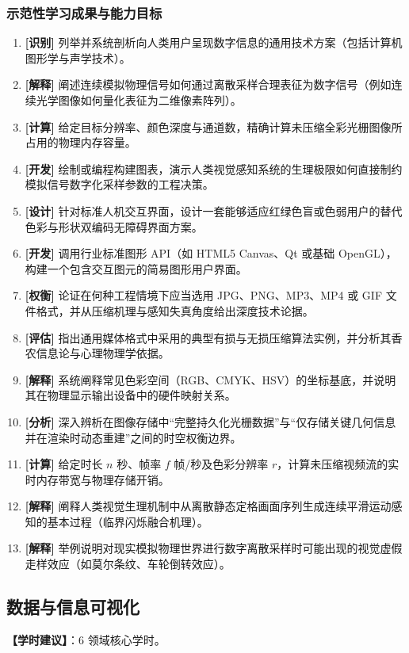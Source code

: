 \subsubsection{示范性学习成果与能力目标}
\begin{enumerate}
    \item \textbf{[识别]} 列举并系统剖析向人类用户呈现数字信息的通用技术方案（包括计算机图形学与声学技术）。
    \item \textbf{[解释]} 阐述连续模拟物理信号如何通过离散采样合理表征为数字信号（例如连续光学图像如何量化表征为二维像素阵列）。
    \item \textbf{[计算]} 给定目标分辨率、颜色深度与通道数，精确计算未压缩全彩光栅图像所占用的物理内存容量。
    \item \textbf{[开发]} 绘制或编程构建图表，演示人类视觉感知系统的生理极限如何直接制约模拟信号数字化采样参数的工程决策。
    \item \textbf{[设计]} 针对标准人机交互界面，设计一套能够适应红绿色盲或色弱用户的替代色彩与形状双编码无障碍界面方案。
    \item \textbf{[开发]} 调用行业标准图形 API（如 HTML5 Canvas、Qt 或基础 OpenGL），构建一个包含交互图元的简易图形用户界面。
    \item \textbf{[权衡]} 论证在何种工程情境下应当选用 JPG、PNG、MP3、MP4 或 GIF 文件格式，并从压缩机理与感知失真角度给出深度技术论据。
    \item \textbf{[评估]} 指出通用媒体格式中采用的典型有损与无损压缩算法实例，并分析其香农信息论与心理物理学依据。
    \item \textbf{[解释]} 系统阐释常见色彩空间（RGB、CMYK、HSV）的坐标基底，并说明其在物理显示输出设备中的硬件映射关系。
    \item \textbf{[分析]} 深入辨析在图像存储中“完整持久化光栅数据”与“仅存储关键几何信息并在渲染时动态重建”之间的时空权衡边界。
    \item \textbf{[计算]} 给定时长 $n$ 秒、帧率 $f$ 帧/秒及色彩分辨率 $r$，计算未压缩视频流的实时内存带宽与物理存储开销。
    \item \textbf{[解释]} 阐释人类视觉生理机制中从离散静态定格画面序列生成连续平滑运动感知的基本过程（临界闪烁融合机理）。
    \item \textbf{[解释]} 举例说明对现实模拟物理世界进行数字离散采样时可能出现的视觉虚假走样效应（如莫尔条纹、车轮倒转效应）。
\end{enumerate}

\subsection{数据与信息可视化}
\textbf{【学时建议】}：6 领域核心学时。


